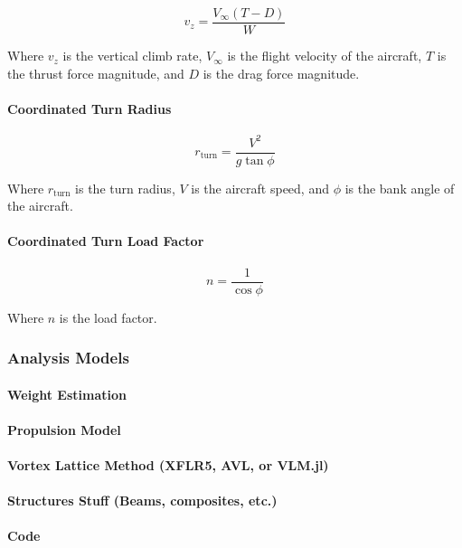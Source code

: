 \documentclass[report]{byu-aero}
\begin{document}
\[ v_z = \frac{V_\infty \left(T - D\right)}{W}\]

Where \(v_z\) is the vertical climb rate, \(V_\infty\) is the flight velocity of the aircraft, \(T\) is the thrust force magnitude, and \(D\) is the drag force magnitude.


\paragraph{Coordinated Turn Radius}

\[r_\text{turn} = \frac{V^2}{g \tan\phi}\]

Where \(r_\text{turn}\) is the turn radius, \(V\) is the aircraft speed, and \(\phi\) is the bank angle of the aircraft.

\paragraph{Coordinated Turn Load Factor}

\[n = \frac{1}{\cos\phi}\]

Where \(n\) is the load factor.

\subsubsection{Analysis Models}


\paragraph{Weight Estimation}


\paragraph{Propulsion Model}


\paragraph{Vortex Lattice Method (XFLR5, AVL, or VLM.jl)}


\paragraph{Structures Stuff (Beams, composites, etc.)}


\paragraph{Code}
\end{document}
